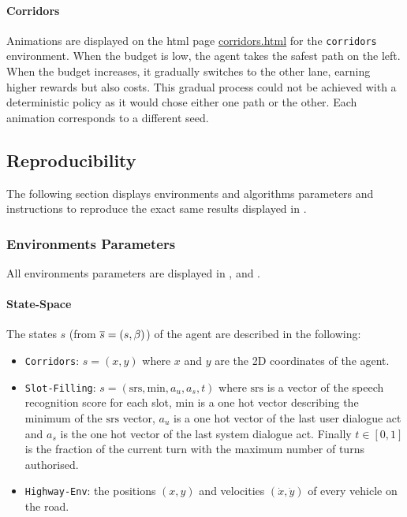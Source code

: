 

\paragraph{Corridors}

Animations are displayed on the html page \url{corridors.html} for the \texttt{corridors} environment. When the budget is low, the agent takes the safest path on the left. When the budget increases, it gradually switches to the other lane, earning higher rewards but also costs. This gradual process could not be achieved with a deterministic policy as it would chose either one path or the other. Each animation corresponds to a different seed.

\subsection{Reproducibility}
\label{subsec:reproducibility-supp}

The following section displays environments and algorithms parameters and instructions to reproduce the exact same results displayed in .

\subsubsection{Environments Parameters}
\label{sec:env-parameters}

All environments parameters are displayed in ,  and .


\paragraph{State-Space}

The states $s$ (from $\overline{s}=(s,\beta)$) of the agent are described in the following:

\begin{itemize}
    \item \texttt{Corridors}: $s = (x,y)$ where $x$ and $y$ are the 2D coordinates of the agent.
    \item \texttt{Slot-Filling}: $s = (\text{srs},\text{min},a_u,a_s,t)$ where $\text{srs}$ is a vector of the speech recognition score for each slot, $\text{min}$ is a one hot vector describing the minimum of the $\text{srs}$ vector, $a_u$ is a one hot vector of the last user dialogue act and $a_s$ is the one hot vector of the last system dialogue act. Finally $t\in[0,1]$ is the fraction of the current turn with the maximum number of turns authorised.
    \item \texttt{Highway-Env}: the positions $(x, y)$ and velocities $(\dot{x}, \dot{y})$ of every vehicle on the road.
\end{itemize}


